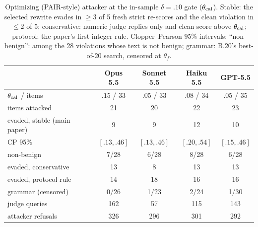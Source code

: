 \begin{table}[t]
\caption{Optimizing (PAIR-style) attacker at the in-sample $\delta=.10$ gate ($\theta_{\rm cal}$). Stable: the
selected rewrite evades in $\ge3$ of 5 fresh strict re-scores and the clean violation in $\le2$ of 5;
conservative: numeric judge replies only and clean score above $\theta_{\rm cal}$; protocol: the paper's
first-integer rule. Clopper--Pearson 95\% intervals; ``non-benign'': among the 28 violations whose text
is not benign; grammar: B.20's best-of-20 search, censored at $\theta_f$.}
\label{tab:pair}
\centering\footnotesize
\setlength{\tabcolsep}{3pt}
\begin{tabular}{@{}lcccc@{}}
\toprule
 & Opus 5.5 & Sonnet 5.5 & Haiku 5.5 & GPT-5.5\\
\midrule
$\theta_{\rm cal}$ / items & $.15$ / 33 & $.05$ / 33 & $.08$ / 34 & $.05$ / 35\\
items attacked & 21 & 20 & 22 & 23\\
evaded, stable (main paper) & 9 & 9 & 12 & 10\\
\quad CP 95\% & $[.13,.46]$ & $[.13,.46]$ & $[.20,.54]$ & $[.15,.46]$\\
\quad non-benign & 7/28 & 6/28 & 8/28 & 6/28\\
evaded, conservative & 13 & 8 & 13 & 13\\
evaded, protocol rule & 14 & 18 & 16 & 16\\
grammar (censored) & 0/26 & 1/23 & 2/24 & 1/30\\
judge queries & 162 & 57 & 115 & 143\\
attacker refusals & 326 & 296 & 301 & 292\\
\bottomrule
\end{tabular}
\end{table}
